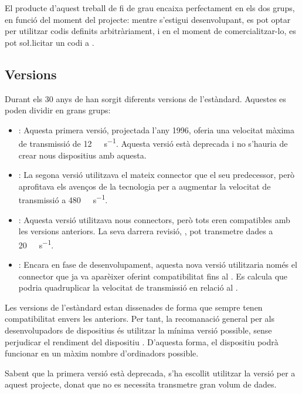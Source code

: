 El producte d'aquest treball de fi de grau encaixa perfectament en els dos
grups, en funció del moment del projecte: mentre s'estigui desenvolupant, es
pot optar per utilitzar codis definits arbitràriament, i en el moment de
comercialitzar-lo, es pot so\l.licitar un codi  a .

\subsection{Versions}
\label{sec:usb_versions}

Durant els 30 anys de  han sorgit diferents versions de
l'estàndard. Aquestes es poden dividir en grans grups:

\begin{itemize}
    \item {}: Aquesta primera versió, projectada l'any 1996, oferia
    una velocitat màxima de transmissió de
    \SI[round-mode=places,round-precision=0]{12}{\mega\bit\per\second}.
    Aquesta versió està deprecada i no s'hauria de crear nous dispositius amb
    aquesta.
    \item {}: La segona versió utilitzava el mateix connector que el
    seu predecessor, però aprofitava els avenços de la tecnologia per a
    augmentar la velocitat de transmissió a
    \SI[round-mode=places,round-precision=0]{480}{\mega\bit\per\second}.
    \item {}: Aquesta versió utilitzava nous connectors, però tots
    eren compatibles amb les versions anteriors. La seva darrera revisió,
    , pot transmetre dades a
    \SI[round-mode=places,round-precision=0]{20}{\giga\bit\per\second}.
    \item {}: Encara en fase de desenvolupament, aquesta nova versió
    utilitzaria només el connector  que ja va aparèixer oferint
    compatibilitat fins al . Es calcula que podria quadruplicar
    la velocitat de transmissió en relació al .
\end{itemize}

Les versions de l'estàndard estan dissenades de forma que sempre tenen
compatibilitat envers les anteriors. Per tant, la recomanació general per als
desenvolupadors de dispositius és utilitzar la mínima versió possible, sense
perjudicar el rendiment del dispositiu  \cite{Axelson2015USB}. D'aquesta forma,
el dispositiu podrà funcionar en un màxim nombre d'ordinadors possible.

Sabent que la primera versió està deprecada, s'ha escollit utilitzar la versió
 per a aquest projecte, donat que no es necessita transmetre gran
volum de dades.

